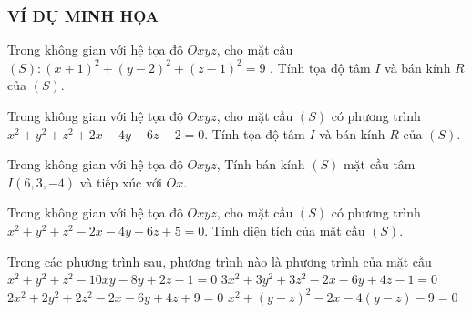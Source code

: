\subsubsection{VÍ DỤ MINH HỌA}
\begin{vd}%
	Trong không gian với hệ tọa độ $Oxyz$, cho mặt cầu $(S )\colon (x+1 )^2+(y-2 )^2+(z-1 )^2=9$ . Tính tọa độ tâm $I$ và bán kính $R$ của $(S )$. 
\end{vd}
\begin{vd}%
	Trong không gian với hệ tọa độ $Oxyz$, cho mặt cầu $(S )$ có phương trình $x^2+y^2+z^2+2x-4y+6z-2=0$. Tính tọa độ tâm $I$ và bán kính $R$ của $(S )$.
\end{vd}
\begin{vd}%
	Trong không gian với hệ tọa độ $Oxyz$, Tính bán kính $(S)$ mặt cầu tâm $I(6,3,-4 )$ và tiếp xúc với $Ox$.
\end{vd}
\begin{vd}%
	Trong không gian với hệ tọa độ $Oxyz$, 
	cho mặt cầu $(S)$ có phương trình $x^2+y^2+z^2-2x-4y-6z+5=0$. 
	Tính diện tích của mặt cầu $(S )$.
\end{vd}
\begin{vd}%
	Trong các phương trình sau, phương trình nào là phương trình của mặt cầu
	\choice 
	{ $x^2+y^2+z^2-10xy-8y+2z-1=0$}
	{ \True $3x^2+3y^2+3z^2-2x-6y+4z-1=0$} 
	{ $2x^2+2y^2+2z^2-2x-6y+4z+9=0$}
	{ $x^2+(y-z )^2-2x-4(y-z )-9=0$} 
\end{vd}
